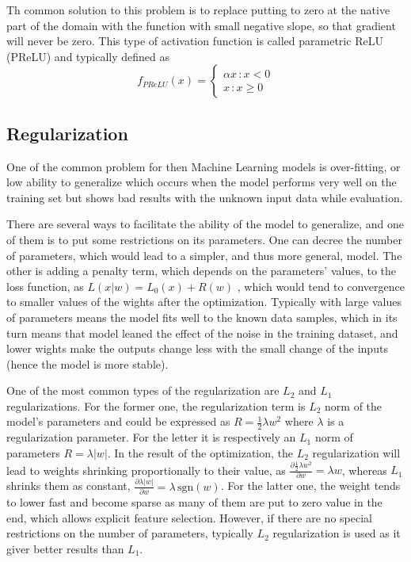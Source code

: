 Th common solution to this problem is to replace putting to zero at the native part of the domain with the function with small negative slope, so that gradient will never be zero. 
This type of activation function is called parametric ReLU (PReLU) and typically defined as  
\[ f_{PReLU}(x) = 
\begin{cases}
	\alpha x \, :x<0 \\
	x \, : x \geq 0
\end{cases}
\]

\subsection{Regularization}

One of the common problem for then Machine Learning models is over-fitting, or low ability to generalize which occurs when the model performs very well on the training set but shows bad results with the unknown input data while evaluation.


There are several ways to facilitate the ability of the model to generalize, and one of them is to put some restrictions on its parameters.
One can decree the number of parameters, which would lead to a simpler, and thus more general, model.
The other is adding a penalty term, which depends on the parameters' values, to the loss function, as $L(x|w) = L_{0}(x) + R(w)$ , which would tend to convergence to smaller values of the wights after the optimization. 
Typically with large values of parameters means the model fits well to the known data samples, which in its turn means that model leaned the effect of the noise in the training dataset, and lower wights make the outputs change less with the small change of the inputs (hence the model is more stable).

One of the most common types of the regularization are $L_{2}$ and $L_{1}$ regularizations.
For the former one, the regularization term is $L_{2}$ norm of the model's parameters and could be expressed as $R=\frac{1}{2}\lambda w^{2}$ where $\lambda$ is a regularization parameter.
For the letter it is respectively an $L_{1}$ norm of parameters $R=\lambda |w|$.
In the result of the optimization, the $L_{2}$ regularization will lead to weights shrinking proportionally to their value, as $\frac{\partial \frac{1}{2} \lambda w^{2} }{\partial w} = \lambda w$, whereas $L_{1}$ shrinks them as constant, $\frac{\partial \lambda |w| }{\partial w} = \lambda \, \mathrm{sgn}(w) $.
For the latter one, the weight tends to lower fast and become sparse as many of them are put to zero value in the end, which allows explicit feature selection.
However, if there are no special restrictions on the number of parameters, typically $L_{2}$ regularization is used as it giver better results than $L_{1}$.

